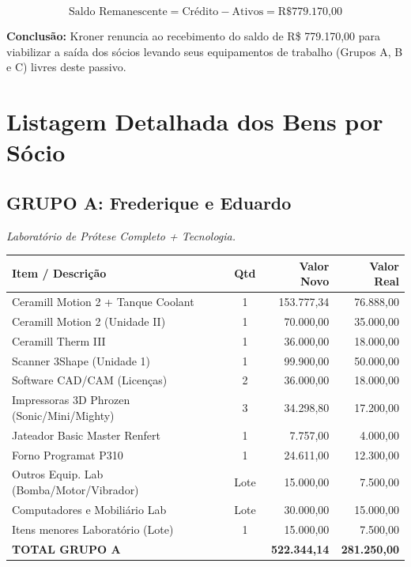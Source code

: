 \documentclass[12pt, a4paper]{article}
\begin{document}
\[
\text{Saldo Remanescente} = \text{Crédito} - \text{Ativos} = \text{R\$ 779.170,00}
\]

\begin{tcolorbox}[colback=assetColor!10, colframe=assetColor, title={\textbf{Acordo Favorável: Perdão da Dívida Remanescente}}]
\textbf{Conclusão:} Kroner renuncia ao recebimento do saldo de R\$ 779.170,00 para viabilizar a saída dos sócios levando seus equipamentos de trabalho (Grupos A, B e C) livres deste passivo.
\end{tcolorbox}

\section{Listagem Detalhada dos Bens por Sócio}

\subsection*{GRUPO A: Frederique e Eduardo}
\textit{Laboratório de Prótese Completo + Tecnologia.}
\begin{longtable}{>{\raggedright\arraybackslash}p{8cm} c r r}
    \toprule
    \rowcolor{tableHeader} \textbf{Item / Descrição} & \textbf{Qtd} & \textbf{Valor Novo} & \textbf{Valor Real} \\
    \midrule
    \endhead
    \rowcolors{2}{white}{gray!10}
    Ceramill Motion 2 + Tanque Coolant & 1 & 153.777,34 & 76.888,00 \\
    Ceramill Motion 2 (Unidade II) & 1 & 70.000,00 & 35.000,00 \\
    Ceramill Therm III & 1 & 36.000,00 & 18.000,00 \\
    Scanner 3Shape (Unidade 1) & 1 & 99.900,00 & 50.000,00 \\
    Software CAD/CAM (Licenças) & 2 & 36.000,00 & 18.000,00 \\
    Impressoras 3D Phrozen (Sonic/Mini/Mighty) & 3 & 34.298,80 & 17.200,00 \\
    Jateador Basic Master Renfert & 1 & 7.757,00 & 4.000,00 \\
    Forno Programat P310 & 1 & 24.611,00 & 12.300,00 \\
    Outros Equip. Lab (Bomba/Motor/Vibrador) & Lote & 15.000,00 & 7.500,00 \\
    Computadores e Mobiliário Lab & Lote & 30.000,00 & 15.000,00 \\
    Itens menores Laboratório (Lote) & 1 & 15.000,00 & 7.500,00 \\
    \midrule
    \rowcolor{lightGray} \textbf{TOTAL GRUPO A} & & \textbf{522.344,14} & \textbf{281.250,00} \\
    \bottomrule
\end{longtable}
\pagebreak
\end{document}
